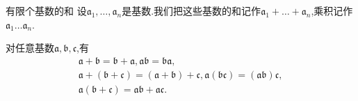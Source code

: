 \begin{definition}{有限个基数的和}{}
	设$\mathfrak{a}_{1},\ldots,\mathfrak{a}_{n}$是基数.我们把这些基数的和记作$\mathfrak{a}_{1}+\ldots+\mathfrak{a}_{n}$,乘积记作$\mathfrak{a}_{1}\ldots\mathfrak{a}_{n}$.
\end{definition}

\begin{corollary}{}{}
	对任意基数$\mathfrak{a},\mathfrak{b},\mathfrak{c}$,有
	\begin{gather*}
		\mathfrak{a}+\mathfrak{b}=\mathfrak{b}+\mathfrak{a},\mathfrak{a}\mathfrak{b}=\mathfrak{b}\mathfrak{a},\\
		\mathfrak{a}+\left(\mathfrak{b}+\mathfrak{c}\right)=\left(\mathfrak{a}+\mathfrak{b}\right)+\mathfrak{c},\mathfrak{a}\left(\mathfrak{b}\mathfrak{c}\right)=\left(\mathfrak{a}\mathfrak{b}\right)\mathfrak{c},\\
		\mathfrak{a}\left(\mathfrak{b}+\mathfrak{c}\right)=\mathfrak{a}\mathfrak{b}+\mathfrak{a}\mathfrak{c}.
	\end{gather*}
\end{corollary}



















